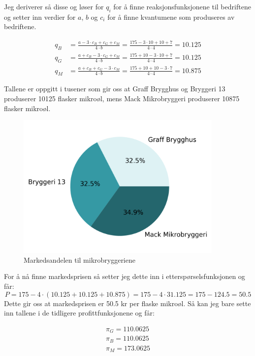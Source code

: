 \documentclass[
  12pt,
  a4paper,
  DIV=11,
  numbers=noendperiod]{scrartcl}
\begin{document}
Jeg deriverer så disse og løser for \(q_i\) for å finne
reaksjonsfunksjonene til bedriftene og setter inn verdier for \(a\),
\(b\) og \(c_i\) for å finne kvantumene som produseres av bedriftene.

\begin{align*}
q_B &= \frac{a-3\cdot c_B + c_G + c_M}{4\cdot b}= \frac{175-3\cdot 10 + 10 + 7}{4\cdot 4} = 10.125 \\
q_G &= \frac{a + c_B - 3\cdot c_G + c_M}{4\cdot b} =  \frac{175 + 10 - 3\cdot 10 + 7}{4\cdot 4} = 10.125 \\
q_M &= \frac{a + c_B + c_G -3\cdot c_M}{4\cdot b} = \frac{175 + 10 + 10 -3\cdot 7}{4\cdot 4} = 10.875
\end{align*}

Tallene er oppgitt i tusener som gir oss at Graff Brygghus og Bryggeri
13 produserer 10125 flasker mikroøl, mens Mack Mikrobryggeri produserer
10875 flasker mikroøl.

\begin{figure}[h]
\centering
\includegraphics[width=0.9\textwidth]{dokumentobjekter/figurer/markedsandel_mikrobryggerier.png}
\caption{Markedsandelen til mikrobryggeriene}
\label{fig:markedsandel}
\end{figure}

For å nå finne markedsprisen så setter jeg dette inn i
etterspørselsfunksjonen og får: \[
P = 175 - 4\cdot(10.125 + 10.125 + 10.875) = 175 - 4\cdot 31.125 = 175 - 124.5 = 50.5
\] Dette gir oss at markedsprisen er 50.5 kr per flaske mikroøl. Så kan
jeg bare sette inn tallene i de tidligere profittfunksjonene og får:

\begin{align*}
\pi_G = 110.0625 \\
\pi_B = 110.0625 \\
\pi_M = 173.0625
\end{align*}
\end{document}
